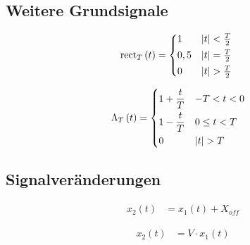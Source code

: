 \subsection{Weitere Grundsignale}
\begin{boxleft}
\end{boxleft}\begin{boxrightshaded}
\begin{align*}
\operatorname{rect}_T\left(t\right)&=
\begin{dcases*}
  1&$\left|t\right|<\frac{T}{2}$\\
0,5& $\left|t\right|=\frac{T}{2}$\\
0& $\left|t\right|>\frac{T}{2}$
\end{dcases*}
\end{align*}
\end{boxrightshaded}


\begin{boxleft}
\end{boxleft}\begin{boxrightshaded}
\begin{align*}
\operatorname{\Lambda}_T\left(t\right)&=
\begin{dcases*}
  1+\frac{t}{T}&$-T<t<0$\\
  1-\frac{t}{T}&$0\leq t<T$\\
  0&$\left|t\right|>T$\\
\end{dcases*}
\end{align*}
\end{boxrightshaded}

\subsection{Signalveränderungen}
\begin{boxleft}
\end{boxleft}\begin{boxrightshaded}
\begin{align*}
x_2\left(t\right)&=x_1\left(t\right)+X_{off}
\end{align*}
\end{boxrightshaded}


\begin{boxleft}
\end{boxleft}\begin{boxrightshaded}
\begin{align*}
x_2\left(t\right)&=V\cdot x_1\left(t\right)
\end{align*}
\end{boxrightshaded}


